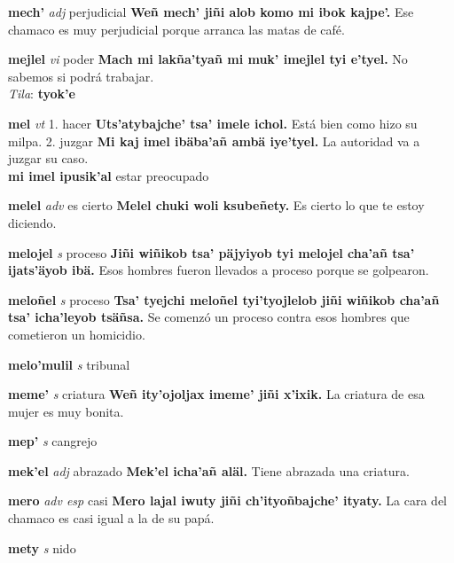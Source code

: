 \documentclass[10pt]{scrbook}
\newcommand{\entry}[1]{\textbf{#1}}
\newcommand{\onedefinition}[1]{#1.}
\newcommand{\partofspeech}[1]{\textit{#1}}
\newcommand{\spanishtranslation}[1]{#1}
\newcommand{\cholexample}[1]{\textbf{#1}}
\newcommand{\exampletranslation}[1]{#1}
\newcommand{\dialectvariant}[1]{\\\textit{#1}:}
\newcommand{\dialectword}[1]{\textbf{#1}}
\newcommand{\secondaryentry}[1]{\\\textbf{#1}}
\newcommand{\secondtranslation}[1]{#1}
\begin{document}
\begin{multicols}{2}
\entry{mech'}
\partofspeech{adj}
\spanishtranslation{perjudicial}
\cholexample{Weñ mech' jiñi alob komo mi ibok kajpe'.}
\exampletranslation{Ese chamaco es muy perjudicial porque arranca las matas de café.}

\entry{mejlel}
\partofspeech{vi}
\spanishtranslation{poder}
\cholexample{Mach mi lakña'tyañ mi muk' imejlel tyi e'tyel.}
\exampletranslation{No sabemos si podrá trabajar.}
\dialectvariant{Tila}
\dialectword{tyok'e}

\entry{mel}
\partofspeech{vt}
\onedefinition{1}
\spanishtranslation{hacer}
\cholexample{Uts'atybajche' tsa' imele ichol.}
\exampletranslation{Está bien como hizo su milpa.}
\onedefinition{2}
\spanishtranslation{juzgar}
\cholexample{Mi kaj imel ibäba'añ ambä iye'tyel.}
\exampletranslation{La autoridad va a juzgar su caso.}
\secondaryentry{mi imel ipusik'al}
\secondtranslation{estar preocupado}

\entry{melel}
\partofspeech{adv}
\spanishtranslation{es cierto}
\cholexample{Melel chuki woli ksubeñety.}
\exampletranslation{Es cierto lo que te estoy diciendo.}

\entry{melojel}
\partofspeech{s}
\spanishtranslation{proceso}
\cholexample{Jiñi wiñikob tsa' päjyiyob tyi melojel cha'añ tsa' ijats'äyob ibä.}
\exampletranslation{Esos hombres fueron llevados a proceso porque se golpearon.}

\entry{meloñel}
\partofspeech{s}
\spanishtranslation{proceso}
\cholexample{Tsa' tyejchi meloñel tyi'tyojlelob jiñi wiñikob cha'añ tsa' icha'leyob tsäñsa.}
\exampletranslation{Se comenzó un proceso contra esos hombres que cometieron un homicidio.}

\entry{melo'mulil}
\partofspeech{s}
\spanishtranslation{tribunal}

\entry{meme'}
\partofspeech{s}
\spanishtranslation{criatura}
\cholexample{Weñ ity'ojoljax imeme' jiñi x'ixik.}
\exampletranslation{La criatura de esa mujer es muy bonita.}

\entry{mep'}
\partofspeech{s}
\spanishtranslation{cangrejo}

\entry{mek'el}
\partofspeech{adj}
\spanishtranslation{abrazado}
\cholexample{Mek'el icha'añ aläl.}
\exampletranslation{Tiene abrazada una criatura.}

\entry{mero}
\partofspeech{adv esp}
\spanishtranslation{casi}
\cholexample{Mero lajal iwuty jiñi ch'ityoñbajche' ityaty.}
\exampletranslation{La cara del chamaco es casi igual a la de su papá.}

\entry{mety}
\partofspeech{s}
\spanishtranslation{nido}


\end{multicols}
\end{document}
